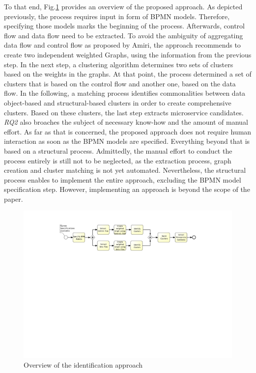 \endgroup
\vspace{0.5cm}



\noindent
To that end, Fig.\ref{fig:thesisProcess} provides an overview of the proposed approach. As depicted previously, the process requires input in form of BPMN models. Therefore, specifying those models marks the beginning of the process. Afterwards, control flow and data flow need to be extracted. To avoid the ambiguity of aggregating data flow and control flow as proposed by Amiri, the approach recommends to create two independent weighted Graphs, using the information from the previous step. In the next step, a clustering algorithm determines two sets of clusters based on the weights in the graphs. At that point, the process determined a set of clusters that is based on the control flow and another one, based on the data flow. In the following, a matching process identifies commonalities between data object-based and structural-based clusters in order to create comprehensive clusters. Based on these clusters, the last step extracts microservice candidates. \\
\textit{RQ2} also broaches the subject of necessary know-how and the amount of manual effort. As far as that is concerned, the proposed approach does not require human interaction as soon as the BPMN models are specified. Everything beyond that is based on a structural process.
Admittedly, the manual effort to conduct the process entirely is still not to be neglected, as the extraction process, graph creation and cluster matching is not yet automated. Nevertheless, the structural process enables to implement the entire approach, excluding the BPMN model specification step. However, implementing an approach is beyond the scope of the paper.




 
\begin{figure}[h!]
	\includegraphics[width=\textwidth, trim={7.5cm 15.3cm 5.0cm 1.5cm}]{img/ThesisProcess.pdf}
	\caption{Overview of the identification approach}
	\label{fig:thesisProcess}
\end{figure}






